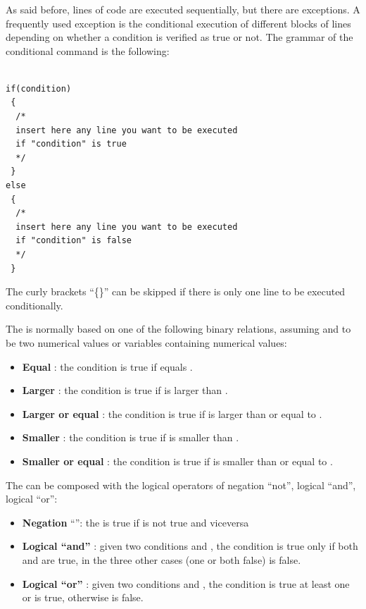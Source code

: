 \documentclass [11pt,a4paper] {book}
\begin{document}
\subsubsection{}
As said before, lines of code are executed sequentially, but there are exceptions. A
frequently used exception is the conditional execution of different blocks of lines
depending on whether a condition is verified as true or not. The grammar of the
conditional command is the following:

\small
\begin{verbatim}

if(condition)
 {
  /*
  insert here any line you want to be executed
  if "condition" is true
  */
 }
else
 {
  /*
  insert here any line you want to be executed
  if "condition" is false
  */
 }
\end{verbatim}
\normalsize

The curly brackets ``\{\}'' can be skipped if there is only one line to be executed
conditionally.

The  is normally based on one of the following binary relations, assuming
 and  to be two numerical values or variables containing numerical
values:
\begin{itemize}
  \item \textbf{Equal} : the condition is true if  equals .
  \item \textbf{Larger} : the condition is true if  is larger than .
  \item \textbf{Larger or equal} : the condition is true if  is larger than or equal to .
  \item \textbf{Smaller} : the condition is true if  is smaller than .
  \item \textbf{Smaller or equal} : the condition is true if  is smaller than or equal to .

\end{itemize}
The  can be composed with the logical operators of negation ``not'', logical
``and'', logical ``or'':
\begin{itemize}
  \item \textbf{Negation} ``\code{!}'': the  is true if   is not true
  and viceversa
  \item \textbf{Logical ``and''} \code{\&\&}: given two conditions  and
  , the condition  is true only if both  and
   are true, in the three other cases (one or both false) is false.
  \item \textbf{Logical ``or''} \code{||}: given two conditions  and
  , the condition  is true at least one  or
   is true, otherwise is false.
\end{itemize}
\end{document}
